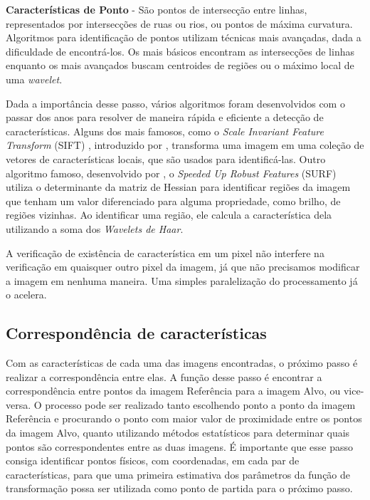 \textbf{Características de Ponto} - São pontos de intersecção entre linhas, representados por intersecções de ruas ou
rios, ou pontos de máxima curvatura. Algoritmos para identificação de pontos utilizam técnicas mais avançadas, dada a 
dificuldade de encontrá-los. Os mais básicos encontram as intersecções de linhas enquanto os mais avançados buscam
centroides de regiões ou o máximo local de uma \textit{wavelet}.

    Dada a importância desse passo, vários algoritmos foram desenvolvidos com o passar dos anos para resolver de maneira
rápida e eficiente a detecção de características. Alguns dos mais famosos, como o 
\textit{Scale Invariant Feature Transform} (SIFT) , introduzido por \cite{lowe1999object}, transforma uma imagem em uma 
coleção de vetores de características locais, que são usados para identificá-las. Outro algoritmo famoso,
desenvolvido por \cite{bay2006surf}, o \textit{Speeded Up Robust Features} (SURF) utiliza o determinante da matriz de
Hessian para identificar regiões da imagem que tenham um valor diferenciado para alguma propriedade, como brilho, de 
regiões vizinhas. Ao identificar uma região, ele calcula a característica dela utilizando a soma dos 
\textit{Wavelets de Haar}.

    A verificação de existência de característica em um pixel não interfere na verificação em quaisquer outro pixel da
imagem, já que não precisamos modificar a imagem em nenhuma maneira. Uma simples paralelização do processamento já o
acelera.

\subsection{Correspondência de características}

    Com as características de cada uma das imagens encontradas, o próximo passo é realizar a correspondência entre elas.
A função desse passo é encontrar a correspondência entre pontos da imagem Referência para a imagem Alvo, ou vice-versa. 
O processo pode ser realizado tanto escolhendo ponto a ponto da imagem Referência e procurando o ponto com maior valor 
de proximidade entre os pontos da imagem Alvo, quanto utilizando métodos estatísticos para determinar quais pontos são 
correspondentes entre as duas imagens. É importante que esse passo consiga identificar pontos físicos, com coordenadas, 
em cada par de características, para que uma primeira estimativa dos parâmetros da função de transformação possa ser 
utilizada como ponto de partida para o próximo passo.

